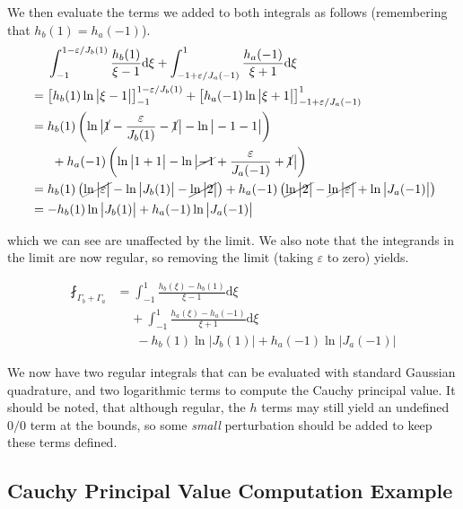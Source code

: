 We then evaluate the terms we added to both integrals as follows (remembering that $h_b(1) = h_a(-1)$).
\[
\begin{aligned}
& ~~~~\int_{-1}^{1 -\varepsilon/J_b(1)} \frac{h_b(1)}{\xi-1} \mathrm{d}\xi + \int_{-1 + \varepsilon/J_a(-1)}^{1} \frac{h_a(-1)}{\xi+1} \mathrm{d}\xi  \\
&=\left[ h_b(1) \ln\big|\xi-1\big|\right]_{-1}^{1 -\varepsilon/J_b(1)} + \left[ h_a(-1)\ln\big|\xi+1\big|\right]_{-1 + \varepsilon/J_a(-1)}^{1} \\
&= h_b(1)\left(\ln\big|\cancel{1}-\frac{\varepsilon}{J_b(1)} - \cancel{1}\big| - \ln\big|-1-1\big| \right) \\
&~~~~~+ h_a(-1)\left(\ln\big|1+1\big| - \ln\big|\cancel{-1}+\frac{\varepsilon}{J_a(-1)} + \cancel{1}\big| \right)
\\
&= h_b(1)\left(\cancel{\ln\big|\varepsilon\big|} - \ln\big|J_b(1) \big| - \cancel{\ln\big|2\big|} \right) + h_a(-1)\left(\cancel{\ln\big|2\big|} - \cancel{\ln\big|\varepsilon\big|} + \ln\big|J_a(-1)\big| \right)\\
& = -h_b(1) \ln \big|J_b(1)\big| +h_a(-1) \ln \big|J_a(-1)\big|
\end{aligned}
\]

which we can see are unaffected by the limit. We also note that the integrands in the limit are now regular, so removing the limit (taking $\varepsilon$ to zero) yields.

\begin{equation}
\begin{split}
\fint_{\Gamma_b + \Gamma_a} &= \int_{-1}^{1} \frac{h_b(\xi)-h_b(1)}{\xi-1} \mathrm{d}\xi \\
&~~~~~+ \int_{-1}^{1} \frac{h_a(\xi)-h_a(-1)}{\xi+1} \mathrm{d}\xi\\ 
&~~~~~~~- h_b(1) \ln \big|J_b(1)\big| + h_a(-1) \ln \big|J_a(-1)\big|
\end{split}
\end{equation}

We now have two regular integrals that can be evaluated with standard Gaussian quadrature, and two logarithmic terms to compute the Cauchy principal value. It should be noted, that although regular, the $h$ terms may still yield an undefined $0/0$ term at the bounds, so some \textit{small} perturbation should be added to keep these terms defined.

\subsection{Cauchy Principal Value Computation Example}

